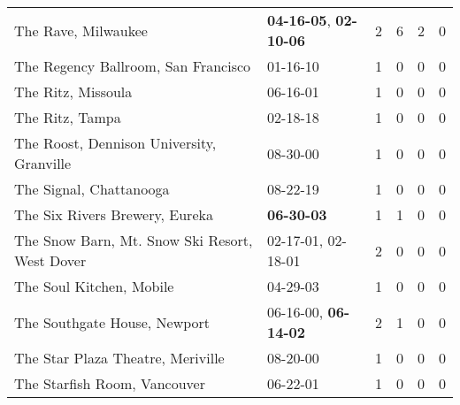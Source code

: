 \begin{longtable}{p{}p{}p{}p{}p{}p{}}
                                                          The Rave, Milwaukee &  \textbf{04-16-05\textsuperscript{}}, \textbf{02-10-06\textsuperscript{}} &  2 &  6 &  2 &  0 \\
                                          The Regency Ballroom, San Francisco &                                                01-16-10\textsuperscript{} &  1 &  0 &  0 &  0 \\
                                                           The Ritz, Missoula &                                                06-16-01\textsuperscript{} &  1 &  0 &  0 &  0 \\
                                                              The Ritz, Tampa &                                                02-18-18\textsuperscript{} &  1 &  0 &  0 &  0 \\
                                    The Roost, Dennison University, Granville &                                                08-30-00\textsuperscript{} &  1 &  0 &  0 &  0 \\
                                                      The Signal, Chattanooga &                                                08-22-19\textsuperscript{} &  1 &  0 &  0 &  0 \\
                                               The Six Rivers Brewery, Eureka &                                       \textbf{06-30-03\textsuperscript{}} &  1 &  1 &  0 &  0 \\
                               The Snow Barn, Mt. Snow Ski Resort, West Dover &                    02-17-01\textsuperscript{}, 02-18-01\textsuperscript{} &  2 &  0 &  0 &  0 \\
                                                     The Soul Kitchen, Mobile &                                                04-29-03\textsuperscript{} &  1 &  0 &  0 &  0 \\
                                                 The Southgate House, Newport &           06-16-00\textsuperscript{}, \textbf{06-14-02\textsuperscript{}} &  2 &  1 &  0 &  0 \\
                                            The Star Plaza Theatre, Meriville &                                                08-20-00\textsuperscript{} &  1 &  0 &  0 &  0 \\
                                                 The Starfish Room, Vancouver &                                                06-22-01\textsuperscript{} &  1 &  0 &  0 &  0 \\

\end{longtable}
